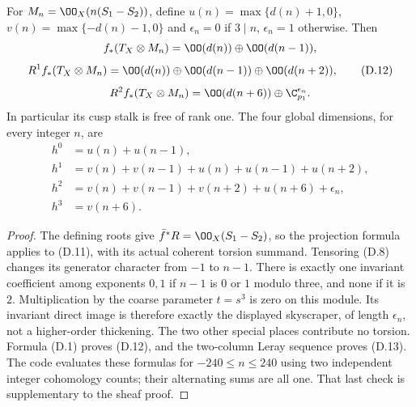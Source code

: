 \begin{proposition}\label{inv:D4.1}
For $M_n=\OO_X(n(S_1-S_2))$, define
$u(n)=\max\{d(n)+1,0\}$, $v(n)=\max\{-d(n)-1,0\}$ and
$\epsilon_n=0$ if $3\mid n$, $\epsilon_n=1$ otherwise. Then
\[
 f_*(T_X\otimes M_n)=\OO(d(n))\oplus\OO(d(n-1)),
\]
\[
 R^1f_*(T_X\otimes M_n)=
 \OO(d(n))\oplus\OO(d(n-1))\oplus\OO(d(n+2)),           \tag{D.12}
\]
\[
 R^2f_*(T_X\otimes M_n)=
 \OO(d(n+6))\oplus\C_{p_1}^{\epsilon_n}.
\]
In particular its cusp stalk is free of rank one. The four global
dimensions, for every integer $n$, are
\begin{align*}
 h^0&=u(n)+u(n-1),\\
 h^1&=v(n)+v(n-1)+u(n)+u(n-1)+u(n+2),\\
 h^2&=v(n)+v(n-1)+v(n+2)+u(n+6)+\epsilon_n,\\
 h^3&=v(n+6).                                          \tag{D.13}
\end{align*}
\end{proposition}
\begin{proof}
The defining roots give $\bar f^*R=\OO_X(S_1-S_2)$, so the projection
formula applies to (D.11), with its actual coherent torsion summand.
Tensoring (D.8) changes its generator character from $-1$ to $n-1$.
There is exactly one invariant coefficient among exponents $0,1$ if
$n-1$ is $0$ or $1$ modulo three, and none if it is $2$. Multiplication
by the coarse parameter $t=s^3$ is zero on this module. Its invariant
direct image is therefore exactly the displayed skyscraper, of
length $\epsilon_n$, not a higher-order thickening. The two other
special places contribute no torsion. Formula (D.1) proves (D.12),
and the two-column Leray sequence proves (D.13). The code evaluates
these formulas for $-240\le n\le240$ using two independent integer
cohomology counts; their alternating sums are all one. That last
check is supplementary to the sheaf proof.
\end{proof}

